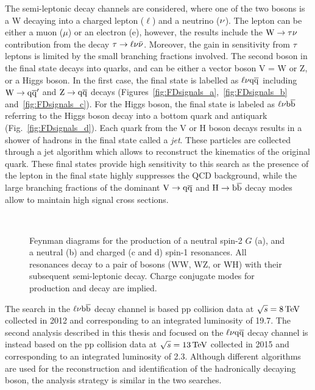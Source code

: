 The semi-leptonic decay channels are considered, where one of the two bosons is a W decaying into a charged lepton ($\ell$) and a neutrino ($\nu$).
The lepton can be either a muon ($\mu$) or an electron (e), however, the results include the $\mathrm{W}\to\tau\nu$ contribution from the decay $\tau\to\ell\nu\bar{\nu}$.
Moreover, the gain in sensitivity from $\tau$ leptons is limited by the small branching fractions involved.
The second boson in the final state decays into quarks, and can be either a vector boson V = W or Z,
or a Higgs boson. In the first case, the final state is labelled as $\ell\nu\mathrm{q}\overline{\mathrm{q}}$ including $\mathrm{W}\to\mathrm{q}\overline{\mathrm{q}}^\prime$ and $\mathrm{Z}\to\mathrm{q}\overline{\mathrm{q}}$ decays (Figures~\ref{fig:FDsignals_a},~\ref{fig:FDsignals_b} and~\ref{fig:FDsignals_c}).
For the Higgs boson, the final state is labeled as $\ell\nu{\mathrm{b}\overline{\mathrm{b}}}$ referring to the Higgs boson decay into a bottom quark and antiquark (Fig.~\ref{fig:FDsignals_d}).
Each quark from the V or H boson decays results in a shower of hadrons in the final state called a \textit{jet}. These particles are collected through a jet algorithm which allows to reconstruct the kinematics of the original quark.
These final states provide high sensitivity to this search as the presence of the lepton in the final state highly suppresses the QCD background, while the large branching fractions of the dominant $\mathrm{V}\to\mathrm{q}\overline{\mathrm{q}}$ and $\mathrm{H}\to{\mathrm{b}\overline{\mathrm{b}}}$ decay modes allow to maintain high signal cross sections.

\begin{figure}[!htb]
\centering
{}\hspace{1cm}
\\
\hspace{1cm}
\caption{Feynman diagrams for the production of a neutral spin-2 $G$ (a), and a neutral \Zpr (b) and charged \Wpr (c and d) spin-1 resonances.
All resonances decay to a pair of bosons (WW, WZ, or WH) with their subsequent semi-leptonic decay. Charge conjugate modes for \Wpr production and decay are implied.}
\label{fig:FDsignals}
\end{figure}

The search in the $\ell\nu{\mathrm{b}\overline{\mathrm{b}}}$ decay channel is based pp collision data at $\sqrt{s} = 8\,\text{Te\hspace{-.08em}V}$ collected in 2012 and corresponding to an integrated luminosity of 19.7\fbinv.
The second analysis described in this thesis and focused on the $\ell\nu\mathrm{q}\overline{\mathrm{q}}$ decay channel is instead based on the pp collision data at $\sqrt{s} = 13\,\text{Te\hspace{-.08em}V}$
collected in 2015 and corresponding to an integrated luminosity of 2.3\fbinv.
Although different algorithms are used for the reconstruction and identification of the hadronically decaying boson, the analysis strategy is similar in the two searches.\\

